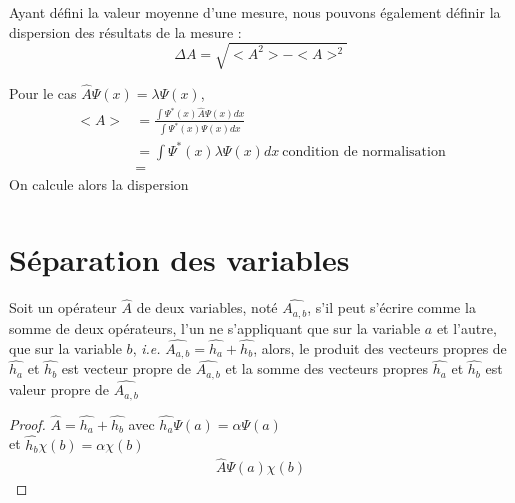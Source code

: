 \documentclass[../main.tex]{subfile}
\begin{document}
Ayant défini la valeur moyenne d'une mesure, nous pouvons également définir la dispersion des résultats de la mesure :
$$\Delta A = \sqrt{<A^2> - <A>^2}$$

\begin{ex}
	Pour le cas $\hat{A} \Psi(x) = \lambda \Psi(x)$, 
	$$
\begin{aligned}
	<A> &= \frac{\int \Psi^*(x) \hat{A} \Psi(x) dx}{\int \Psi^*(x) \Psi(x) dx}\\
	&= \int \Psi^*(x) \lambda \Psi(x) dx \ \text{condition de normalisation}\\
	&= 
\end{aligned}
	$$
	On calcule alors la dispersion 
	$$
\begin{aligned}
\end{aligned}
	$$
\end{ex}

\section{Séparation des variables}

	Soit un opérateur $\hat{A}$ de deux variables, noté $\hat{A_{a,b}}$, s'il peut s'écrire comme la somme de deux opérateurs, l'un ne s'appliquant que sur la variable $a$ et l'autre, que sur la variable $b$, \textit{i.e.} $\hat{A_{a,b}}=\hat{h_a} + \hat{h_b}$, alors, le produit des vecteurs propres de $\hat{h_a}$ et $\hat{h_b}$ est vecteur propre de $\hat{A_{a, b}}$ et la somme des vecteurs propres $\hat{h_a}$ et $\hat{h_b}$ est valeur propre de $\hat{A_{a,b}}$

\begin{proof}	
	$\hat{A} = \hat{h_a} + \hat{h_b}$ avec $\hat{h_a} \Psi(a) = \alpha \Psi(a)$\\
	et $\hat{h_b} \chi(b) = \alpha \chi(b)$\\

	$$
\begin{aligned}
	\hat{A}\Psi(a)\chi(b)
\end{aligned}
	$$
\end{proof}
\end{document}
